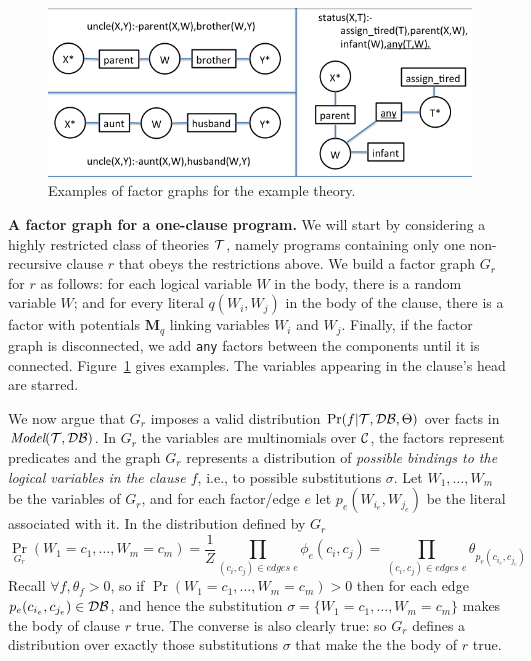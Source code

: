 \documentclass{article}
\newcommand{\cd}[1]{{\small \texttt{#1}}}
\newcommand{\mysubsection}[1]{\textbf{{#1}.}}
\newcommand{\M}{\textbf{M}}
\newcommand{\model}{\textit{Model}}
\newcommand{\C}{{\cal{C}}}
\newcommand{\T}{{\cal{T}}}
\newcommand{\DB}{{\cal{DB}}}
\begin{document}
\begin{figure}
\centerline{\includegraphics[width=0.8\linewidth]{figures/factor-graphs.png}}
\caption{\small Examples of factor graphs for the example
  theory.} \label{fig:factors}
\end{figure}

\mysubsection{A factor graph for a one-clause program} We will start
by considering a highly restricted class of theories $\T$, namely
programs containing only one non-recursive clause $r$ that obeys the
restrictions above.  We build a factor graph $G_r$ for $r$ as follows:
for each logical variable $W$ in the body, there is a random variable
$W$; and for every literal $q(W_i,W_j)$ in the body of the clause,
there is a factor with potentials $\M_q$ linking variables $W_i$ and
$W_j$.  Finally, if the factor graph is disconnected, we add \cd{any}
factors between the components until it is connected.
Figure~\ref{fig:factors} gives examples.  The variables appearing in
the clause's head are starred.

We now argue that $G_r$ imposes a valid distribution
$\Pr(f|\T,\DB,\Theta)$ over facts in $\model(\T,\DB)$.  In $G_r$ the
variables are multinomials over $\C$, the factors represent predicates
and the graph $G_r$ represents a distribution of \emph{possible
  bindings to the logical variables in the clause $f$}, i.e., to
possible substitutions $\sigma$. Let $W_1,\ldots,W_m$ be the variables
of $G_r$, and for each factor/edge $e$ let $p_e(W_{i_e},W_{j_e})$ be
the literal associated with it. In the distribution defined by $G_r$
\[
 \Pr_{G_r}(W_1=c_1,\ldots,W_m=c_m) = \frac{1}{Z}
 \prod_{(c_i,c_j)\in\textit{edges $e$}} \phi_e(c_i,c_j) =
 \prod_{(c_i,c_j)\in\textit{edges $e$}} \theta_{p_e(c_{i_e},c_{j_e})}
\]
Recall $\forall f,\theta_f>0$, so if $\Pr(W_1=c_1,\ldots,W_m=c_m)>0$
then for each edge $p_e(c_{i_e},c_{j_e}) \in \DB$, and hence the
substitution $\sigma=\{W_1=c_1,\ldots,W_m=c_m\}$ makes the body of
clause $r$ true.  The converse is also clearly true: so $G_r$ defines
a distribution over exactly those substitutions $\sigma$ that make the
the body of $r$ true.  
\end{document}
